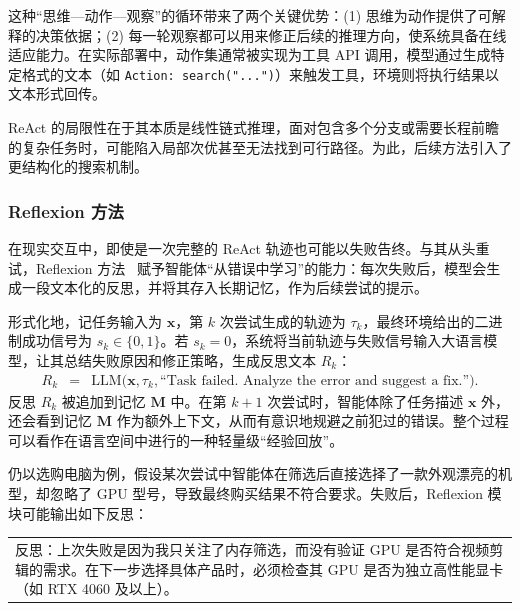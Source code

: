 \vspace{0.5em}

这种“思维—动作—观察”的循环带来了两个关键优势：(1) 思维为动作提供了可解释的决策依据；(2) 每一轮观察都可以用来修正后续的推理方向，使系统具备在线适应能力。在实际部署中，动作集通常被实现为工具 API 调用，模型通过生成特定格式的文本（如 \texttt{Action: search("...")}）来触发工具，环境则将执行结果以文本形式回传。

ReAct 的局限性在于其本质是线性链式推理，面对包含多个分支或需要长程前瞻的复杂任务时，可能陷入局部次优甚至无法找到可行路径。为此，后续方法引入了更结构化的搜索机制。

\subsubsection{Reflexion 方法}

在现实交互中，即使是一次完整的 ReAct 轨迹也可能以失败告终。与其从头重试，Reflexion 方法~\cite{shinn-etal:2023reflexion} 赋予智能体“从错误中学习”的能力：每次失败后，模型会生成一段文本化的反思，并将其存入长期记忆，作为后续尝试的提示。

形式化地，记任务输入为 $\mathbf{x}$，第 $k$ 次尝试生成的轨迹为 $\tau_k$，最终环境给出的二进制成功信号为 $s_k \in \{0,1\}$。若 $s_k = 0$，系统将当前轨迹与失败信号输入大语言模型，让其总结失败原因和修正策略，生成反思文本 $R_k$：
\begin{eqnarray}
R_k &=& \text{LLM}\bigl(\mathbf{x}, \tau_k, \text{``Task failed. Analyze the error and suggest a fix.''}\bigr).
\end{eqnarray}
反思 $R_k$ 被追加到记忆 $\mathbf{M}$ 中。在第 $k+1$ 次尝试时，智能体除了任务描述 $\mathbf{x}$ 外，还会看到记忆 $\mathbf{M}$ 作为额外上下文，从而有意识地规避之前犯过的错误。整个过程可以看作在语言空间中进行的一种轻量级“经验回放”。

仍以选购电脑为例，假设某次尝试中智能体在筛选后直接选择了一款外观漂亮的机型，却忽略了 GPU 型号，导致最终购买结果不符合要求。失败后，Reflexion 模块可能输出如下反思：

\vspace{0.5em}

\begin{tcolorbox}

\begingroup

\renewcommand{\arraystretch}{1.0}

\setlength{\tabcolsep}{6pt}

\begin{tabular}{p{\linewidth}}

反思：上次失败是因为我只关注了内存筛选，而没有验证 GPU 是否符合视频剪辑的需求。在下一步选择具体产品时，必须检查其 GPU 是否为独立高性能显卡（如 RTX 4060 及以上）。

\end{tabular}

\endgroup

\end{tcolorbox}

